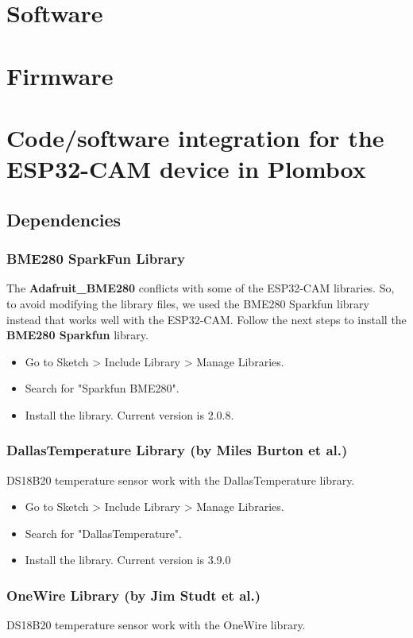 \documentclass[a4paper,11pt]{article}
\begin{document}
\section{Software}
\section{Firmware}
\section{Code/software integration  for the ESP32-CAM device in Plombox}

\subsection{Dependencies}
\subsubsection{BME280 SparkFun Library}
The \textbf{Adafruit\_BME280} conflicts with some of the ESP32-CAM libraries. So, to
avoid modifying the library files, we used the BME280 Sparkfun library instead
that works well with the ESP32-CAM. Follow the next steps to install the
\textbf{BME280 Sparkfun} library.

\begin{itemize}
	\item Go to Sketch > Include Library > Manage Libraries.
\item Search for "Sparkfun BME280".
\item Install the library. Current version is 2.0.8.
\end{itemize}

\subsubsection{DallasTemperature Library (by Miles Burton et al.)}
DS18B20 temperature sensor work with the DallasTemperature library.

\begin{itemize}
\item Go to Sketch > Include Library > Manage Libraries.
\item Search for "DallasTemperature".
\item Install the library. Current version is 3.9.0
\end{itemize}

\subsubsection{ OneWire Library (by Jim Studt et al.)}
DS18B20 temperature sensor work with the OneWire library.
\end{document}
